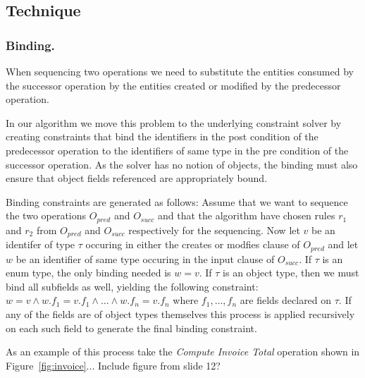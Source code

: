 \subsection{Technique}
\label{sec:technique}


\subsubsection{Binding.}
When sequencing two operations we need to substitute the entities
consumed by the successor operation by the entities created or
modified by the predecessor operation.

In our algorithm we move this problem to the underlying constraint
solver by creating constraints that bind the identifiers in the post
condition of the predecessor operation to the identifiers of same type
in the pre condition of the successor operation. As the solver has no
notion of objects, the binding must also ensure that object fields
referenced are appropriately bound.

Binding constraints are generated as follows: Assume that we want to
sequence the two operations $O_{pred}$ and $O_{succ}$ and that the
algorithm have chosen rules $r_1$ and $r_2$ from $O_{pred}$ and
$O_{succ}$ respectively for the sequencing. Now let $v$ be an
identifer of type $\tau$ occuring in either the creates or modfies
clause of $O_{pred}$ and let $w$ be an identifier of same type
occuring in the input clause of $O_{succ}$. If $\tau$ is an enum type,
the only binding needed is $w = v$. If $\tau$ is an object type, then
we must bind all subfields as well, yielding the following constraint:
$w = v \wedge w.f_1 = v.f_1 \wedge \ldots \wedge w.f_n = v.f_n$ where
$f_1, \ldots , f_n$ are fields declared on $\tau$. If any of the
fields are of object types themselves this process is applied
recursively on each such field to generate the final binding
constraint.

As an example of this process take the \emph{Compute Invoice Total}
operation shown in Figure~\ref{fig:invoice}... Include figure from
slide 12?
